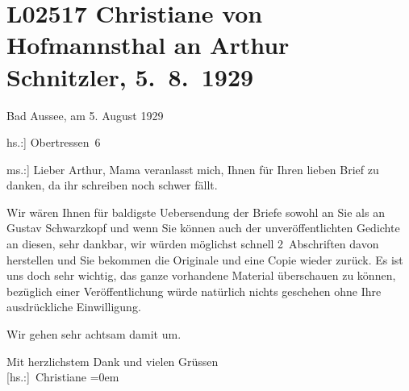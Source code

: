 

\section[Christiane von Hofmannsthal an Arthur Schnitzler, 5. 8. 1929]{L02517 Christiane von Hofmannsthal an Arthur Schnitzler, 5. 8. 1929}
\nopagebreak{}
\rehead{ }\normalsize\beginnumbering{}
\toendnotes[C]{\smallbreak\pagebreak[2]}
\pstart
           \raggedleft{}{\pb}Bad Aussee, am 5. August 1929\pend
           
\pstart
           \raggedleft{}{[}hs.:{]} Obertressen 6\pend
           
\pstart{}{[}ms.:{]} Lieber Arthur,\pend\vspace{0.5em}
\pstart
           Mama veranlasst mich, Ihnen für Ihren lieben
               Brief zu danken, da ihr schreiben noch schwer fällt.\pend
           
\pstart
           Wir wären Ihnen für baldigste Uebersendung der Briefe sowohl an Sie als an Gustav Schwarzkopf und wenn Sie können auch der
               unveröffentlichten Gedichte an diesen, sehr dankbar, wir würden möglichst schnell
               2 Abschriften davon herstellen und Sie bekommen die Originale und eine Copie wieder
               zurück. Es ist uns doch sehr
               wichtig, das
               ganze vorhandene Material überschauen zu können, bezüglich einer Veröffentlichung
               würde natürlich nichts geschehen ohne Ihre ausdrückliche Einwilligung.\pend
           
\pstart
           Wir gehen sehr achtsam damit um.\pend
           
\pstart
           Mit herzlichstem Dank und vielen Grüssen{\\[\baselineskip]}\spacefill\mbox{{[}hs.:{]} Christiane}\pend
           \leftskip=0em{}\endnumbering{}  
      